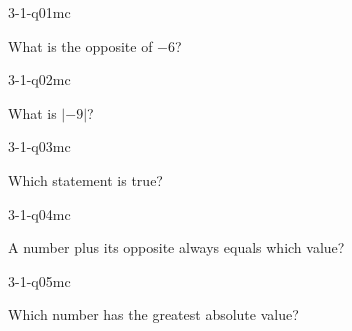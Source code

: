

\begin{practiceQuestion}{3-1-q01}{mc}
\begin{questionText}
What is the opposite of $-6$?
\end{questionText}
\end{practiceQuestion}

\begin{practiceQuestion}{3-1-q02}{mc}
\begin{questionText}
What is $|-9|$?
\end{questionText}
\end{practiceQuestion}

\begin{practiceQuestion}{3-1-q03}{mc}
\begin{questionText}
Which statement is true?
\end{questionText}
\end{practiceQuestion}

\begin{practiceQuestion}{3-1-q04}{mc}
\begin{questionText}
A number plus its opposite always equals which value?
\end{questionText}
\end{practiceQuestion}

\begin{practiceQuestion}{3-1-q05}{mc}
\begin{questionText}
Which number has the greatest absolute value?
\end{questionText}
\end{practiceQuestion}

